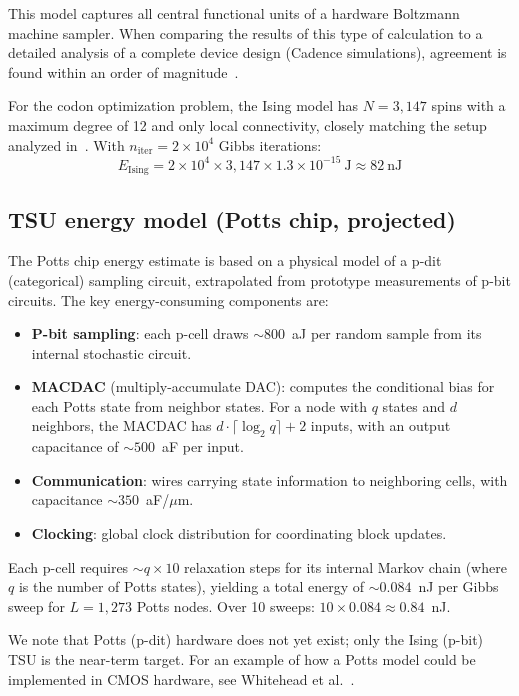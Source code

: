 \documentclass[11pt]{article}
\begin{document}
This model captures all central functional units of a hardware Boltzmann machine sampler.
When comparing the results of this type of calculation to a detailed analysis of a complete device design (Cadence simulations), agreement is found within an order of magnitude~\cite{jelincic2025dtm}.

For the codon optimization problem, the Ising model has $N = 3{,}147$ spins with a maximum degree of 12 and only local connectivity, closely matching the setup analyzed in~\cite{jelincic2025dtm}.
With $n_{\mathrm{iter}} = 2 \times 10^4$ Gibbs iterations:
\begin{equation}
  E_{\mathrm{Ising}} = 2 \times 10^4 \times 3{,}147 \times 1.3 \times 10^{-15}~\text{J} \approx 82~\text{nJ}
\end{equation}

\subsection*{TSU energy model (Potts chip, projected)}

The Potts chip energy estimate is based on a physical model of a p-dit (categorical) sampling circuit, extrapolated from prototype measurements of p-bit circuits.
The key energy-consuming components are:

\begin{itemize}
  \item \textbf{P-bit sampling}: each p-cell draws ${\sim}800$~aJ per random sample from its internal stochastic circuit.
  \item \textbf{MACDAC} (multiply-accumulate DAC): computes the conditional bias for each Potts state from neighbor states. For a node with $q$ states and $d$ neighbors, the MACDAC has $d \cdot \lceil\log_2 q\rceil + 2$ inputs, with an output capacitance of ${\sim}500$~aF per input.
  \item \textbf{Communication}: wires carrying state information to neighboring cells, with capacitance ${\sim}350$~aF/$\mu$m.
  \item \textbf{Clocking}: global clock distribution for coordinating block updates.
\end{itemize}

Each p-cell requires ${\sim}q \times 10$ relaxation steps for its internal Markov chain (where $q$ is the number of Potts states), yielding a total energy of ${\sim}0.084$~nJ per Gibbs sweep for $L = 1{,}273$ Potts nodes.
Over 10 sweeps: $10 \times 0.084 \approx 0.84$~nJ.

We note that Potts (p-dit) hardware does not yet exist; only the Ising (p-bit) TSU is the near-term target.
For an example of how a Potts model could be implemented in CMOS hardware, see Whitehead et al.~\cite{whitehead2023}.
\end{document}
